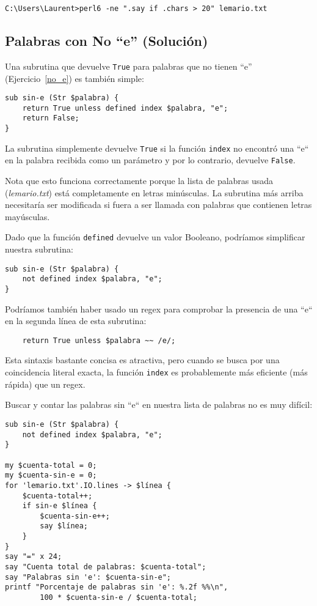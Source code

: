 \begin{verbatim}
C:\Users\Laurent>perl6 -ne ".say if .chars > 20" lemario.txt
\end{verbatim} 
%

\subsection{Palabras con No ``e'' (Solución)}

Una subrutina que devuelve {\tt True} para palabras que no tienen ``e''
(Ejercicio~\ref{no_e}) es también simple:

\begin{verbatim}
sub sin-e (Str $palabra) {
    return True unless defined index $palabra, "e";
    return False;
}
\end{verbatim}
%

La subrutina simplemente devuelve {\tt True} si la función {\tt index} 
no encontró una ``e`` en la palabra recibida como un parámetro y
por lo contrario, devuelve {\tt False}.

Nota que esto funciona correctamente porque la lista de palabras usada
(\emph{lemario.txt}) está completamente en letras minúsculas. La subrutina
más arriba necesitaría ser modificada si fuera a ser llamada con palabras
que contienen letras mayúsculas.

Dado que la función {\tt defined} devuelve un valor Booleano, podríamos 
simplificar nuestra subrutina:
\begin{verbatim}
sub sin-e (Str $palabra) {
    not defined index $palabra, "e";
}
\end{verbatim}
%

Podríamos también haber usado un regex para comprobar la 
presencia de una ``e`` en la segunda línea de esta subrutina:

\begin{verbatim}
    return True unless $palabra ~~ /e/;
\end{verbatim}
%

Esta sintaxis bastante concisa es atractiva, pero cuando se
busca por una coincidencia literal exacta, la función {\tt index}
es probablemente más eficiente (más rápida) que un regex.

Buscar y contar las palabras sin ``e`` en nuestra lista de palabras 
no es muy difícil:

\begin{verbatim}
sub sin-e (Str $palabra) {
    not defined index $palabra, "e";
}

my $cuenta-total = 0;
my $cuenta-sin-e = 0;
for 'lemario.txt'.IO.lines -> $línea { 
    $cuenta-total++;
    if sin-e $línea {
        $cuenta-sin-e++;
        say $línea;
    }
}
say "=" x 24;
say "Cuenta total de palabras: $cuenta-total";
say "Palabras sin 'e': $cuenta-sin-e";
printf "Porcentaje de palabras sin 'e': %.2f %%\n", 
        100 * $cuenta-sin-e / $cuenta-total;
\end{verbatim}

